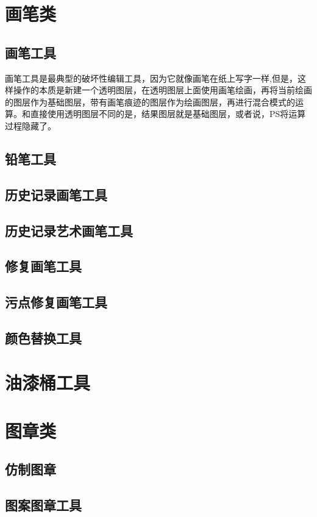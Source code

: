 \section{画笔类}
\subsection{画笔工具}
画笔工具是最典型的破坏性编辑工具，因为它就像画笔在纸上写字一样,但是，这样操作的本质是新建一个透明图层，在透明图层上面使用画笔绘画，再将当前绘画的图层作为基础图层，带有画笔痕迹的图层作为绘画图层，再进行混合模式的运算。和直接使用透明图层不同的是，结果图层就是基础图层，或者说，PS将运算过程隐藏了。

\newpage
\subsection{铅笔工具}
\newpage
\subsection{历史记录画笔工具}
\newpage
\subsection{历史记录艺术画笔工具}
\newpage
\subsection{修复画笔工具}
\newpage
\subsection{污点修复画笔工具}
\newpage
\subsection{颜色替换工具}
\newpage
\section{油漆桶工具}
\newpage
\section{图章类}
\newpage
\subsection{仿制图章}
\newpage
\subsection{图案图章工具}
\newpage
